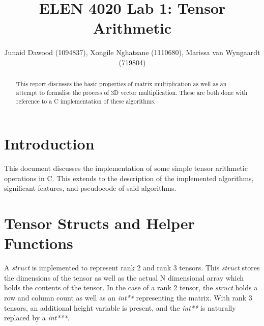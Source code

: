\documentclass[journal,10pt]{IEEEtran}
\begin{document}
%
\title{ELEN 4020 Lab 1: Tensor Arithmetic}
%
%
%
\author{Junaid Dawood (1094837), Xongile Nghatsane (1110680), Marissa van Wyngaardt (719804)}%



\maketitle


\begin{abstract}
This report discusses the basic properties of matrix multiplication as well as an attempt to formalise the process of 3D vector multiplication. These are both done with reference to a C implementation of these algorithms.
\end{abstract}

\IEEEpeerreviewmaketitle

\section{Introduction}

This document discusses the implementation of some simple tensor arithmetic operations in C. This extends to the description of the implemented algorithms, significant features, and pseudocode of said algorithms.

\section{Tensor Structs and Helper Functions}

A \textit{struct} is implemented to represent rank 2 and rank 3 tensors. This \textit{struct} stores the dimensions of the tensor as well as the actual N dimensional array which holds the contents of the tensor. In the case of a rank 2 tensor, the \textit{struct} holds a row and column count as well as an \textit{int**} representing the matrix. With rank 3 tensors, an additional height variable is present, and the \textit{int**} is naturally replaced by a \textit{int***}.
\end{document}
